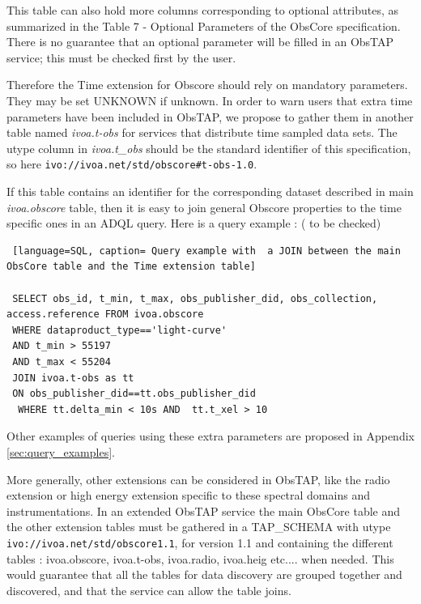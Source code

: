 \documentclass[11pt,a4paper]{ivoa}
\begin{document}
 This table can also hold more columns corresponding to  optional attributes, as summarized in the Table 7 - Optional Parameters  of the ObsCore specification.
 There is no guarantee that an optional parameter will be filled in an ObsTAP service; this must be checked first by the user.

 Therefore the Time extension for Obscore should rely on mandatory parameters.
 They may be set UNKNOWN if unknown.
 In order to warn users that extra time parameters have been included in ObsTAP, we propose to gather them  in another table named \emph{ivoa.t-obs}
 for services that distribute time sampled data sets.
 The utype column in  \emph{ivoa.t\_obs} should be the standard identifier of this specification, so here \texttt{ivo://ivoa.net/std/obscore\#t-obs-1.0}.

 If this table contains an identifier for the corresponding dataset described in main \emph{ivoa.obscore} table, then it is easy to join  general Obscore properties to the time specific ones in an ADQL query.
 Here is a query  example :  ( to be checked)
 \begin{lstlisting} [language=SQL, caption= Query example with  a JOIN between the main ObsCore table and the Time extension table]

 SELECT obs_id, t_min, t_max, obs_publisher_did, obs_collection, access.reference FROM ivoa.obscore
 WHERE dataproduct_type=='light-curve'
 AND t_min > 55197
 AND t_max < 55204
 JOIN ivoa.t-obs as tt
 ON obs_publisher_did==tt.obs_publisher_did
  WHERE tt.delta_min < 10s AND  tt.t_xel > 10
 \end{lstlisting}

Other examples of queries using these extra parameters are proposed in Appendix \ref{sec:query_examples}.

More generally, other extensions can be considered in ObsTAP, like the radio extension or high energy extension specific to these spectral domains and instrumentations.
In an extended ObsTAP service the main ObsCore table and the other extension tables must be gathered in a TAP\_SCHEMA with utype \\ \texttt{ivo://ivoa.net/std/obscore1.1}, for version 1.1 and containing the different tables : ivoa.obscore, ivoa.t-obs, ivoa.radio, ivoa.heig etc.... when needed.
This would guarantee that all the tables for data discovery are grouped together and discovered, and that the service can allow the table joins.

\end{document}
